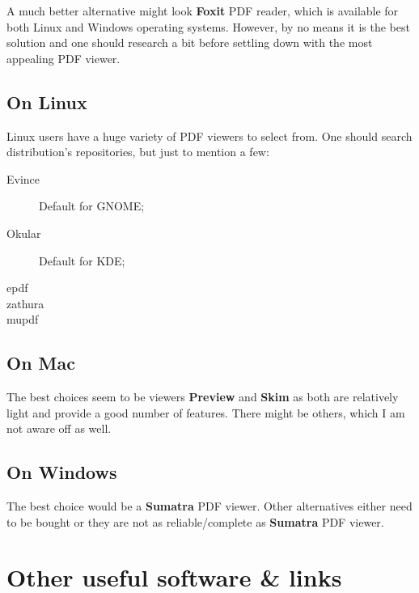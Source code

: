 A much better alternative might look \textbf{Foxit} PDF reader, which is
available for both Linux and Windows operating systems. However, by no means it
is the best solution and one should research a bit before settling down with the
most appealing PDF viewer.

\subsection{On Linux}

Linux users have a huge variety of PDF viewers to select from. One should search
distribution's repositories, but just to mention a few:
\begin{description}
    \item[Evince] Default for GNOME;
    \item[Okular] Default for KDE;
    \item[epdf]
    \item[zathura]
    \item[mupdf]
\end{description}

\subsection{On Mac}

The best choices seem to be viewers \textbf{Preview} and \textbf{Skim} as both
are relatively light and provide a good number of features. There might be
others, which I am not aware off as well.

\subsection{On Windows}

The best choice would be a \textbf{Sumatra} PDF viewer. Other alternatives
either need to be bought or they are not as reliable/complete as
\textbf{Sumatra} PDF viewer.

\section{Other useful software \& links}



